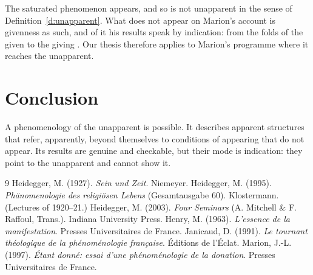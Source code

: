 \documentclass{situationist-preprint}
\begin{document}
\begin{reply}
The saturated phenomenon appears, and so is not unapparent in the sense of Definition~\ref{d:unapparent}. What does not appear on Marion's account is givenness as such, and of it his results speak by indication: from the folds of the given to the giving \citep{Marion1997}. Our thesis therefore applies to Marion's programme where it reaches the unapparent.
\end{reply}

\section{Conclusion}

A phenomenology of the unapparent is possible. It describes apparent structures that refer, apparently, beyond themselves to conditions of appearing that do not appear. Its results are genuine and checkable, but their mode is indication: they point to the unapparent and cannot show it.

\begin{thebibliography}{9}\small
{} Heidegger, M. (1927). \emph{Sein und Zeit}. Niemeyer.
 Heidegger, M. (1995). \emph{Phänomenologie des religiösen Lebens} (Gesamtausgabe 60). Klostermann. (Lectures of 1920--21.)
 Heidegger, M. (2003). \emph{Four Seminars} (A. Mitchell \& F. Raffoul, Trans.). Indiana University Press.
 Henry, M. (1963). \emph{L'essence de la manifestation}. Presses Universitaires de France.
 Janicaud, D. (1991). \emph{Le tournant théologique de la phénoménologie française}. Éditions de l'Éclat.
 Marion, J.-L. (1997). \emph{Étant donné: essai d'une phénoménologie de la donation}. Presses Universitaires de France.
\end{thebibliography}
\end{document}
